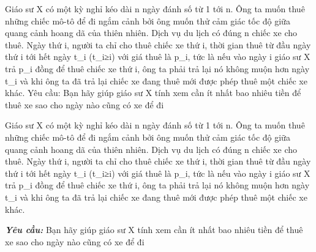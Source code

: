 Giáo sư X có một kỳ nghỉ kéo dài n ngày đánh số từ 1 tới n. Ông ta muốn thuê những chiếc mô-tô để đi ngắm cảnh bởi ông muốn thử cảm giác tốc độ giữa quang cảnh hoang dã của thiên nhiên. Dịch vụ du lịch có đúng n chiếc xe cho thuê. Ngày thứ i, người ta chỉ cho thuê chiếc xe thứ i, thời gian thuê từ đầu ngày thứ i tới hết ngày t\_i (t\_i≥i) với giá thuê là p\_i, tức là nếu vào ngày i giáo sư X trả p\_i đồng để thuê chiếc xe thứ i, ông ta phải trả lại nó không muộn hơn ngày t\_i và khi ông ta đã trả lại chiếc xe đang thuê mới được phép thuê một chiếc xe khác.       Yêu cầu: Bạn hãy giúp giáo sư X tính xem cần ít nhất bao nhiêu tiền để thuê xe sao cho ngày nào cũng có xe để đi    



   Giáo sư X có một kỳ nghỉ kéo dài n ngày đánh số từ 1 tới n. Ông ta muốn thuê những chiếc mô-tô để đi ngắm cảnh bởi ông muốn thử cảm giác tốc độ giữa quang cảnh hoang dã của thiên nhiên. Dịch vụ du lịch có đúng n chiếc xe cho thuê. Ngày thứ i, người ta chỉ cho thuê chiếc xe thứ i, thời gian thuê từ đầu ngày thứ i tới hết ngày t\_i (t\_i≥i) với giá thuê là p\_i, tức là nếu vào ngày i giáo sư X trả p\_i đồng để thuê chiếc xe thứ i, ông ta phải trả lại nó không muộn hơn ngày t\_i và khi ông ta đã trả lại chiếc xe đang thuê mới được phép thuê một chiếc xe khác.  

\textbf{\emph{     Yêu cầu:    }}   Bạn hãy giúp giáo sư X tính xem cần ít nhất bao nhiêu tiền để thuê xe sao cho ngày nào cũng có xe để đi  





\